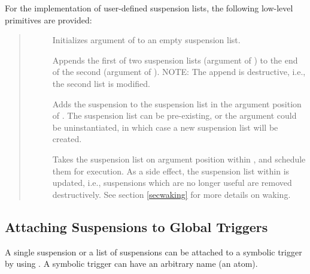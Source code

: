 {For the implementation of user-defined suspension lists,
the following low-level primitives are provided:
\begin{quote}
\begin{description}
\item[]
    Initializes argument  of  to an empty
    suspension list.
\item[]
    Appends the first of two suspension lists (argument
     of
    ) to
    the end of the second (argument  of ). NOTE: The
    append is destructive, i.e., the second list is modified.
\item[]
    Adds the suspension  to the suspension list in the
    argument position  of . The suspension list can be
    pre-existing,
    or the argument could be uninstantiated, in which case a new suspension
    list will be created.
\item[]
    Takes the suspension list on argument position  within
    , and schedule them for execution.
    As a side effect, the suspension list within  is updated,
    i.e., suspensions which are no longer useful are removed destructively.
    See section \ref{secwaking} for more details on waking.
\end{description}
\end{quote}


\subsection{Attaching Suspensions to Global Triggers}
A single suspension or a list of suspensions can be attached to a
symbolic trigger by using
.
A symbolic trigger can have an arbitrary name (an atom).




}

